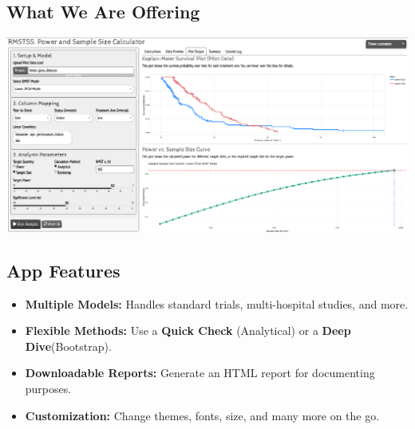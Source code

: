 \documentclass[a0,landscape]{a0poster}
\begin{document}
\begin{minipage}[t]{0.48\linewidth}
    \subsection*{\huge What We Are Offering}
    \begin{center}
        \includegraphics[width=\linewidth]{images/app-ss.png}
    \end{center}
    
    \vfill %
    
    \subsection*{\Large App Features}
    \begin{itemize}
        \item \large \textbf{Multiple Models:} Handles standard trials, multi-hospital studies, and more.
        \item \large \textbf{Flexible Methods:} Use a \textbf{Quick Check} (Analytical) or a \textbf{Deep Dive}(Bootstrap).
        \item \large \textbf{Downloadable Reports:} Generate an HTML report for documenting purposes.
        \item \large \textbf{Customization:} Change themes, fonts, size, and many more on the go.
    \end{itemize}
    
    \vfill %


\end{minipage}
\end{document}
